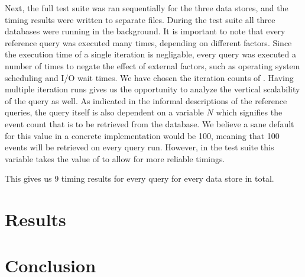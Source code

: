 Next, the full test suite was ran sequentially for the three data stores, and the timing results were written to separate files.
During the test suite all three databases were running in the background.
It is important to note that every reference query was executed many times, depending on different factors.
Since the execution time of a single iteration is negligable, every query was executed a number of times to negate the effect of external factors, such as operating system scheduling and I/O wait times.
We have chosen the iteration counts of .
Having multiple iteration runs gives us the opportunity to analyze the vertical scalability of the query as well.
As indicated in the informal descriptions of the reference queries, the query itself is also dependent on a variable $N$ which signifies the event count that is to be retrieved from the database.
We believe a sane default for this value in a concrete implementation would be 100, meaning that 100 events will be retrieved on every query run.
However, in the test suite this variable takes the value of  to allow for more reliable timings.

This gives us 9 timing results for every query for every data store in total.

\section{Results}
\label{sec:results}

\section{Conclusion}
\label{sec:comparative-study-conclusion}
